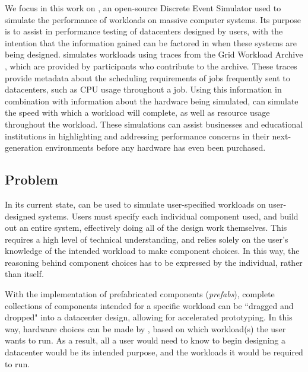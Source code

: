 \documentclass[11pt]{article}
\begin{document}
		We focus in this work on \opendc{}, an open-source Discrete Event Simulator used to simulate the performance of workloads on massive computer systems. 
		Its purpose is to assist in performance testing of datacenters designed by users, with the intention that the information gained can be factored in when these systems are being designed. 
		\opendc{} simulates workloads using traces from the Grid Workload Archive \cite{Iosup2008}, which are provided by participants who contribute to the archive. 
		These traces provide metadata about the scheduling requirements of jobs frequently sent to datacenters, such as CPU usage throughout a job. 
		Using this information in combination with information about the hardware being simulated, \opendc{} can simulate the speed with which a workload will complete, as well as resource usage throughout the workload. 
		These simulations can assist businesses and educational institutions in highlighting and addressing performance concerns in their next-generation environments before any hardware has even been purchased.
	
	\subsection{Problem}
		In its current state, \opendc{} can be used to simulate user-specified workloads on user-designed systems. 
		Users must specify each individual component used, and build out an entire system, effectively doing all of the design work themselves. 
		This requires a high level of technical understanding, and relies solely on the user's knowledge of the intended workload to make component choices. 
		In this way, the reasoning behind component choices has to be expressed by the individual, rather than \opendc{} itself.  

		With the implementation of prefabricated components (\textit{prefabs}), complete collections of components intended for a specific workload can be ``dragged and dropped" into a datacenter design, allowing for accelerated prototyping.
		In this way, hardware choices can be made by \opendc{}, based on which workload(s) the user wants to run.
		As a result, all a user would need to know to begin designing a datacenter would be its intended purpose, and the workloads it would be required to run.
\end{document}
